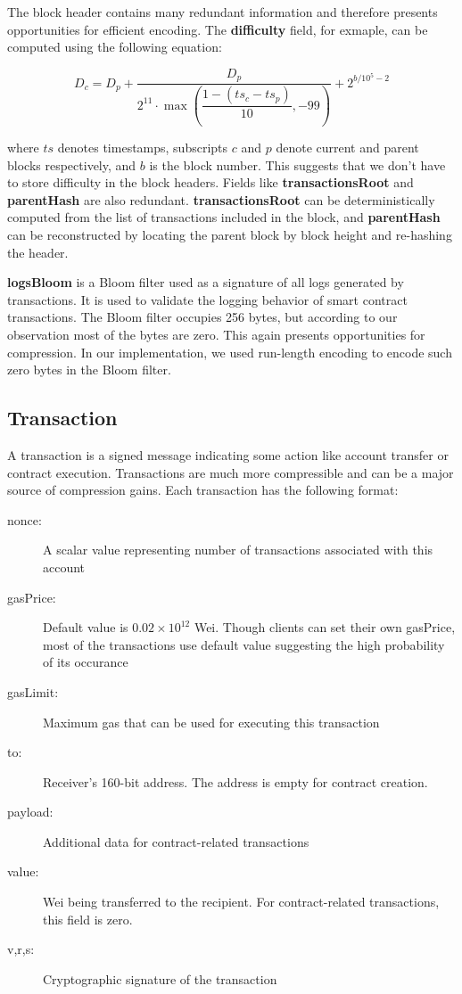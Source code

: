 The block header contains many redundant information and therefore presents opportunities for efficient encoding.
The \textbf{difficulty} field, for exmaple, can be computed using the following equation:

$$
D_{c} = D_{p} + \dfrac{D_{p}}{2^{11}\cdot\max\left(\dfrac{1 - (ts_{c} - ts_{p})}{10}, -99\right)} + 2^{b/10^5-2}
$$

where $ts$ denotes timestamps, subscripts $c$ and $p$ denote current and parent blocks respectively, and $b$ is the block number.
This suggests that we don't have to store difficulty in the block headers.
Fields like \textbf{transactionsRoot} and \textbf{parentHash} are also redundant.
\textbf{transactionsRoot} can be deterministically computed from the list of transactions included in the block,
and \textbf{parentHash} can be reconstructed by locating the parent block by block height and re-hashing the header.

\textbf{logsBloom} is a Bloom filter used as a signature of all logs generated by transactions.
It is used to validate the logging behavior of smart contract transactions. The Bloom filter occupies 256 bytes,
but according to our observation most of the bytes are zero. This again presents opportunities for compression.
In our implementation, we used run-length encoding to encode such zero bytes in the Bloom filter.

\subsection{Transaction}

A transaction is a signed message indicating some action like account transfer or contract execution.
Transactions are much more compressible and can be a major source of compression gains.
Each transaction has the following format:
\begin{description}
  \item[nonce:] A scalar value representing number of transactions associated with this account
  \item[gasPrice:] Default value is $0.02\times10^{12}$ Wei. Though clients can set their own gasPrice, most of the transactions use default value suggesting the high probability of its occurance
  \item[gasLimit:] Maximum gas that can be used for executing this transaction
  \item[to:] Receiver's 160-bit address. The address is empty for contract creation.
  \item[payload:] Additional data for contract-related transactions
  \item[value:] Wei being transferred to the recipient. For contract-related transactions, this field is zero.
  \item[v,r,s:] Cryptographic signature of the transaction
\end{description}

